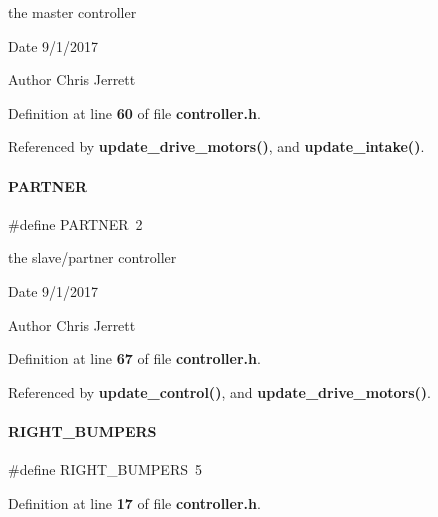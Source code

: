 the master controller 

\begin{DoxyDate}{Date}
9/1/2017 
\end{DoxyDate}
\begin{DoxyAuthor}{Author}
Chris Jerrett 
\end{DoxyAuthor}


Definition at line \textbf{ 60} of file \textbf{ controller.\+h}.



Referenced by \textbf{ update\+\_\+drive\+\_\+motors()}, and \textbf{ update\+\_\+intake()}.

\mbox{\label{controller_8h_a136e64cf351535da81cacb6a546cade6}} 
\paragraph{P\+A\+R\+T\+N\+ER}
{\footnotesize\ttfamily \#define P\+A\+R\+T\+N\+ER~2}



the slave/partner controller 

\begin{DoxyDate}{Date}
9/1/2017 
\end{DoxyDate}
\begin{DoxyAuthor}{Author}
Chris Jerrett 
\end{DoxyAuthor}


Definition at line \textbf{ 67} of file \textbf{ controller.\+h}.



Referenced by \textbf{ update\+\_\+control()}, and \textbf{ update\+\_\+drive\+\_\+motors()}.

\mbox{\label{controller_8h_a635896b08789914290171051d1b82465}} 
\paragraph{R\+I\+G\+H\+T\+\_\+\+B\+U\+M\+P\+E\+RS}
{\footnotesize\ttfamily \#define R\+I\+G\+H\+T\+\_\+\+B\+U\+M\+P\+E\+RS~5}



Definition at line \textbf{ 17} of file \textbf{ controller.\+h}.


